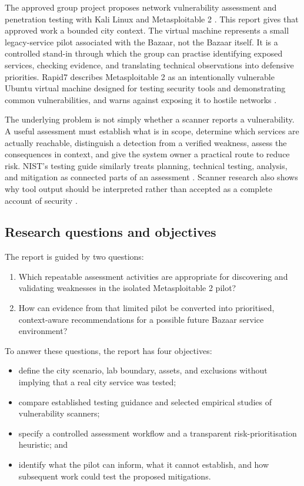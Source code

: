 \documentclass[11pt,a4paper]{article}
\begin{document}
The approved group project proposes network vulnerability assessment and penetration testing with Kali Linux and Metasploitable 2 \citep{groupproposal2026}. This report gives that approved work a bounded city context. The virtual machine represents a small legacy-service pilot associated with the Bazaar, not the Bazaar itself. It is a controlled stand-in through which the group can practise identifying exposed services, checking evidence, and translating technical observations into defensive priorities. Rapid7 describes Metasploitable 2 as an intentionally vulnerable Ubuntu virtual machine designed for testing security tools and demonstrating common vulnerabilities, and warns against exposing it to hostile networks \citep{rapid7_metasploitable}.

The underlying problem is not simply whether a scanner reports a vulnerability. A useful assessment must establish what is in scope, determine which services are actually reachable, distinguish a detection from a verified weakness, assess the consequences in context, and give the system owner a practical route to reduce risk. NIST's testing guide similarly treats planning, technical testing, analysis, and mitigation as connected parts of an assessment \citep{scarfone2008}. Scanner research also shows why tool output should be interpreted rather than accepted as a complete account of security \citep{alsaleh2017,alazmi2022}.

\subsection{Research questions and objectives}
The report is guided by two questions:
\begin{enumerate}
  \item Which repeatable assessment activities are appropriate for discovering and validating weaknesses in the isolated Metasploitable 2 pilot?
  \item How can evidence from that limited pilot be converted into prioritised, context-aware recommendations for a possible future Bazaar service environment?
\end{enumerate}

To answer these questions, the report has four objectives:
\begin{itemize}
  \item define the city scenario, lab boundary, assets, and exclusions without implying that a real city service was tested;
  \item compare established testing guidance and selected empirical studies of vulnerability scanners;
  \item specify a controlled assessment workflow and a transparent risk-prioritisation heuristic; and
  \item identify what the pilot can inform, what it cannot establish, and how subsequent work could test the proposed mitigations.
\end{itemize}
\end{document}
